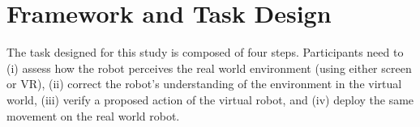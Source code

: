 \documentclass[letterpaper, 10 pt, conference]{ieeeconf}  %
\begin{document}




\section{Framework and Task Design}
\label{sec:tech}
The task designed for this study is composed of four steps. Participants need to (i) assess how the robot perceives the real world environment (using either screen or VR), (ii) correct the robot's understanding of the environment in the virtual world, (iii) verify a proposed action of the virtual robot, and (iv) deploy the same movement on the real world robot.

\end{document}
